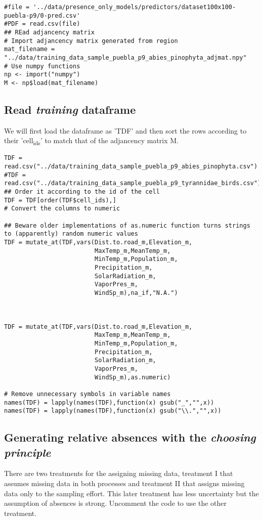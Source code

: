 \documentclass[11pt]{article}
\begin{document}
\begin{verbatim}
#file = '../data/presence_only_models/predictors/dataset100x100-puebla-p9/0-pred.csv'
#PDF = read.csv(file)
## REad adjancency matrix
# Import adjancency matrix generated from region
mat_filename = "../data/training_data_sample_puebla_p9_abies_pinophyta_adjmat.npy"
# Use numpy functions
np <- import("numpy")
M <- np$load(mat_filename)
\end{verbatim}

\subsection{Read \emph{training} dataframe}
\label{sec:org9dbb526}
We will first load the dataframe as 'TDF' and then sort the rows according to their 'cell\textsubscript{ids}' to match that of the adjancency matrix M.

\begin{verbatim}
TDF = read.csv("../data/training_data_sample_puebla_p9_abies_pinophyta.csv")
#TDF = read.csv("../data/training_data_sample_puebla_p9_tyrannidae_birds.csv")
## Order it according to the id of the cell
TDF = TDF[order(TDF$cell_ids),]
# Convert the columns to numeric

## Beware older implementations of as.numeric function turns strings to (apparently) random numeric values
TDF = mutate_at(TDF,vars(Dist.to.road_m,Elevation_m,
                         MaxTemp_m,MeanTemp_m,
                         MinTemp_m,Population_m,
                         Precipitation_m,
                         SolarRadiation_m,
                         VaporPres_m,
                         WindSp_m),na_if,"N.A.")



TDF = mutate_at(TDF,vars(Dist.to.road_m,Elevation_m,
                         MaxTemp_m,MeanTemp_m,
                         MinTemp_m,Population_m,
                         Precipitation_m,
                         SolarRadiation_m,
                         VaporPres_m,
                         WindSp_m),as.numeric)

# Remove unnecessary symbols in variable names
names(TDF) = lapply(names(TDF),function(x) gsub("_","",x))
names(TDF) = lapply(names(TDF),function(x) gsub("\\.","",x))

\end{verbatim}

\subsection{Generating relative absences with  the \emph{choosing principle}}
\label{sec:org630a3ce}
There are two treatments for the assigning missing data, treatment I that assumes missing data in both processes and treatment II that assigns missing data only to the sampling effort. This later treatment has less uncertainty but the assumption of absences is strong. Uncomment the code to use the other treatment.
\end{document}
